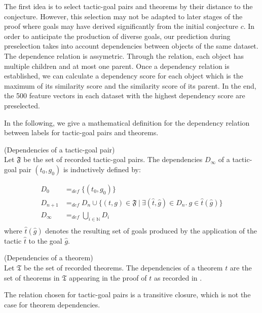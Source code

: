\documentclass[runningheads,a4paper,draft]{svjour3}
\begin{document}
The first idea is to select tactic-goal pairs and theorems by their distance to 
the conjecture. However, this selection may not be adapted to later stages of 
the proof where goals may have derived significantly from the 
initial conjecture $c$. In order to 
anticipate the production of diverse goals, our prediction during preselection
takes into account dependencies between objects of the same dataset.
The dependence relation is assymetric. Through the relation, each object has 
multiple children and at most one parent.
Once a dependency relation is established, we can calculate a dependency score 
for each object which is the maximum of its similarity score and the similarity 
score of its parent. In the end, the 500 feature vectors in each dataset with 
the highest dependency score are preselected.

In the following, we give a mathematical definition for the dependency relation 
between labels for tactic-goal pairs and theorems.

\begin{definition}(Dependencies of a tactic-goal pair)\\
Let $\mathfrak{F}$ be the set of recorded tactic-goal pairs.
The dependencies $D_\infty$ of a tactic-goal pair $(t_0,g_0)$ is 
inductively defined by:

\begin{align*}
D_0 &=_{def} \lbrace (t_0,g_0) \rbrace \\
D_{n+1} &=_{def} D_n \cup \lbrace (t,g)\in \mathfrak{F}\  |\ \exists 
(\hat{t},\hat{g}) \in D_n.\ g \in \hat{t}(\hat{g}) \rbrace  \\
D_\infty &=_{def} \bigcup_{i \in \mathbb{N}} D_i\\
\end{align*}
where $\hat{t}(\hat{g})$ denotes the resulting set of goals produced by the 
application 
of the tactic $\hat{t}$ to the goal $\hat{g}$.
\end{definition}


\begin{definition}(Dependencies of a theorem)\\
Let $\mathfrak{T}$ be the set of recorded theorems.
The dependencies of a theorem $t$ are the set of theorems in 
$\mathfrak{T}$ appearing in the proof of $t$ as recorded in 
\cite{tgck-cpp15}.
\end{definition}

\begin{remark}
The relation chosen for tactic-goal pairs is a transitive 
closure, which is not the case for theorem dependencies.
\end{remark}
\end{document}
